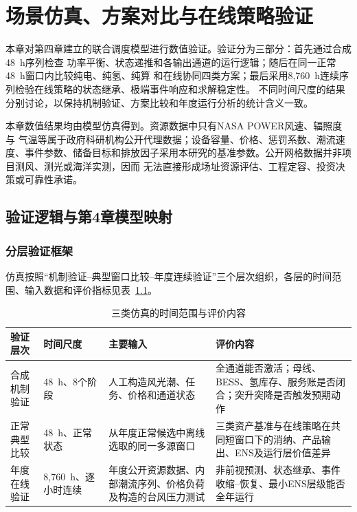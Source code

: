 \chapter{场景仿真、方案对比与在线策略验证}
\label{chap:simulation}

本章对第四章建立的联合调度模型进行数值验证。验证分为三部分：首先通过合成48~h序列检查
功率平衡、状态递推和各输出通道的运行逻辑；随后在同一正常48~h窗口内比较纯电、纯氢、纯算
和在线协同四类方案；最后采用8,760~h连续序列检验在线策略的状态继承、极端事件响应和求解稳定性。
不同时间尺度的结果分别讨论，以保持机制验证、方案比较和年度运行分析的统计含义一致。

本章数值结果均由模型仿真得到。资源数据中只有NASA POWER风速、辐照度与
气温等属于政府科研机构公开代理数据；设备容量、价格、惩罚系数、潮流速度、事件参数、储备目标和排放因子采用本研究的基准参数。公开网格数据并非项目测风、测光或海洋实测，因而
无法直接形成场址资源评估、工程定容、投资决策或可靠性承诺。

\section{验证逻辑与第4章模型映射}

\subsection{分层验证框架}

仿真按照“机制验证--典型窗口比较--年度连续验证”三个层次组织，各层的时间范围、输入数据和评价指标见表~\ref{tab:c5-evidence-levels}。

\begin{table}[htbp]
\centering
\caption{三类仿真的时间范围与评价内容}
\label{tab:c5-evidence-levels}
\begin{tabularx}{\textwidth}{p{2.5cm}p{2.6cm}p{3.3cm}X}
\toprule
验证层次 & 时间尺度 & 主要输入 & 评价内容\\
\midrule
合成机制验证 & 48~h、8个阶段 & 人工构造风光潮、任务、价格和通道状态 & 全通道能否激活；母线、BESS、氢库存、服务账是否闭合；突升突降是否触发预期动作\\
正常典型比较 & 48~h、正常状态 & 从年度正常候选中离线选取的同一多源窗口 & 三类资产基准与在线策略在共同短窗口下的消纳、产品输出、ENS及运行层价值差异\\
年度在线验证 & 8,760~h、逐小时连续 & 年度公开资源数据、内部潮流序列、价格负荷及构造的台风压力测试 & 非前视预测、状态继承、事件收缩--恢复、最小ENS层级能否全年运行\\
\bottomrule
\end{tabularx}
\end{table}

